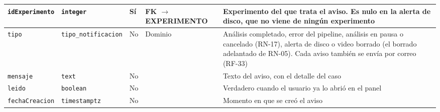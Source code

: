 {\begin{longtable}{|>{\raggedright}p{3.7cm}|>{\raggedright}p{2.3cm}|>{\centering}p{0.9cm}|>{\raggedright}p{2.3cm}|>{\raggedright\arraybackslash}p{4.2cm}|}
\texttt{idExperimento} & \texttt{integer} & Sí & FK $\to$ EXPERIMENTO & Experimento del que trata el aviso. Es nulo en la alerta de disco, que no viene de ningún experimento \\
\hline
\texttt{tipo} & \texttt{tipo\_\allowbreak{}notificacion} & No & Dominio & Análisis completado, error del pipeline, análisis en pausa o cancelado (RN-17), alerta de disco o video borrado (el borrado adelantado de RN-05). Cada aviso también se envía por correo (RF-33) \\
\hline
\texttt{mensaje} & \texttt{text} & No & & Texto del aviso, con el detalle del caso \\
\hline
\texttt{leido} & \texttt{boolean} & No & & Verdadero cuando el usuario ya lo abrió en el panel \\
\hline
\texttt{fechaCreacion} & \texttt{timestamptz} & No & & Momento en que se creó el aviso \\
\hline
\end{longtable}
}
